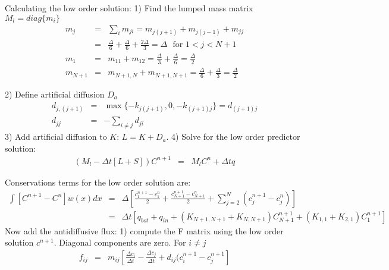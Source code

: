 Calculating the low order solution:
1) Find the lumped mass matrix $M_l = diag\{m_i\}$
\begin{eqnarray}
m_j & = & \sum_i m_{ji} = m_{j(j+1)} + m_{j(j-1)} + m_{jj} \nonumber
\\
 & = & \frac{\Delta}{6} + \frac{\Delta}{6} + \frac{2\Delta}{3} =
 \Delta \ \ \ \mbox{for }1 < j < N+1 \nonumber \\
m_1 & = & m_{11} + m_{12} = \frac{\Delta}{3} + \frac{\Delta}{6} =
\frac{\Delta}{2} \nonumber \\
m_{N+1} & = & m_{N+1,N} + m_{N+1,N+1} = \frac{\Delta}{6} + \frac{\Delta}{3} =
\frac{\Delta}{2}
\end{eqnarray}

2) Define artificial diffusion $D_a$
\begin{eqnarray}
d_{j,(j+1)} & = & \max\{ -k_{j(j+1)},0,-k_{(j+1)j}\} = d_{(j+1)j}
\nonumber \\
d_{jj} & = & -\sum_{i\neq j} d_{ji}
\end{eqnarray}
3) Add artificial diffusion to $K$: $L = K + D_a$. 4) Solve for the low order predictor solution:
\begin{eqnarray}
(M_l -\Delta t [L+S])C^{n+1} & = & M_l C^{n} + \Delta t q
\end{eqnarray}


Conservations terms for the low order solution are:
\begin{eqnarray}
\int \left[C^{n+1} -C^{n}\right] w(x)dx & = & 
 \Delta \left[\frac{c^{n+1}_1-c^{n}_1}{2} +
   \frac{c^{n+1}_{N+1}-c^{n}_{N+1}}{2} + \sum_{j =
     2}^{N}(c^{n+1}_{j}-c^{n}_{j})\right] \nonumber \\
&  = &   \Delta t \left[ q_{bot} +
q_{in} + (K_{N+1,N+1}+ K_{N,N+1} )C^{n+1}_{N+1} + (K_{1,1} +
K_{2,1})C^{n+1}_{1}\right]  \nonumber 
\end{eqnarray}
Now add the antidiffusive flux:
1) compute the F matrix using the low order solution $c^{n+1}$.  Diagonal components are zero.  For $i \neq j$
\begin{eqnarray}
f_{ij} & = & m_{ij}\left[\frac{\Delta c_i}{\Delta t} - \frac{\Delta
    c_j}{\Delta t} + d_{ij}(c^{n+1}_i - c^{n+1}_j\right]
\end{eqnarray}
